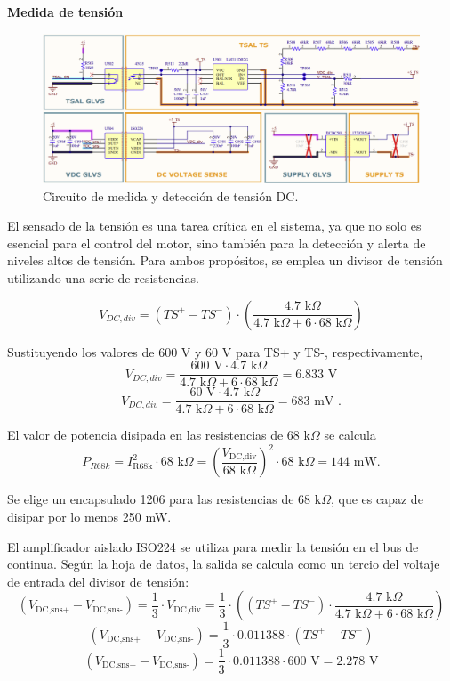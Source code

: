 \textbf{Medida de tensión}

\begin{figure}[H]
	\centering
	\includegraphics[width=0.8\linewidth]{fig/Vmeas-sch}
	\caption{Circuito de medida y detección de tensión DC.}
\end{figure}

El sensado de la tensión es una tarea crítica en el sistema, ya que no solo es esencial para el control del motor, sino también para la detección y alerta de niveles altos de tensión. Para ambos propósitos, se emplea un divisor de tensión utilizando una serie de resistencias. 

\[ V_{DC,div} = \left(TS^+ - TS^-\right) \cdot \left( \frac{4.7 \text{ k}\Omega}{4.7 \text{ k}\Omega + 6 \cdot 68 \text{ k}\Omega} \right) \]

Sustituyendo los valores de 600 V y 60 V para TS+ y TS-, respectivamente,
\[ V_{DC,div} = \frac{600 \text{ V} \cdot 4.7 \text{ k}\Omega}{4.7 \text{ k}\Omega + 6 \cdot 68 \text{ k}\Omega} = 6.833 \text{ V} \]
\[ V_{DC,div} = \frac{60 \text{ V} \cdot 4.7 \text{ k}\Omega}{4.7 \text{ k}\Omega + 6 \cdot 68 \text{ k}\Omega} = 683 \text{ mV .} \]

El valor de potencia disipada en las resistencias de 68 k$\Omega$ se calcula 
\[ P_{R68k} = I_{\text{R68k}}^2 \cdot 68\text{ k}\Omega = \left( \frac{V_{\text{DC,div}}}{68\text{ k}\Omega} \right)^2 \cdot 68 \text{ k}\Omega = 144 \text{ mW.} \]

Se elige un encapsulado 1206 para las resistencias de 68 k$\Omega$, que es capaz de disipar por lo menos 250 mW.

El amplificador aislado ISO224 se utiliza para medir la tensión en el bus de continua. Según la hoja de datos, la salida se calcula como un tercio del voltaje de entrada del divisor de tensión:
\[ (V_{\text{DC,sns+}} - V_{\text{DC,sns-}}) = \frac{1}{3} \cdot V_{\text{DC,div}} = \frac{1}{3} \cdot \left( (TS^+ - TS^-) \cdot \frac{4.7 \text{ k}\Omega}{4.7 \text{ k}\Omega + 6 \cdot 68 \text{ k}\Omega} \right) \]
\[ (V_{\text{DC,sns+}} - V_{\text{DC,sns-}}) = \frac{1}{3} \cdot 0.011388 \cdot (TS^+ - TS^-) \]
\[ (V_{\text{DC,sns+}} - V_{\text{DC,sns-}}) = \frac{1}{3} \cdot 0.011388 \cdot 600 \text{ V} = 2.278 \text{ V} \]

